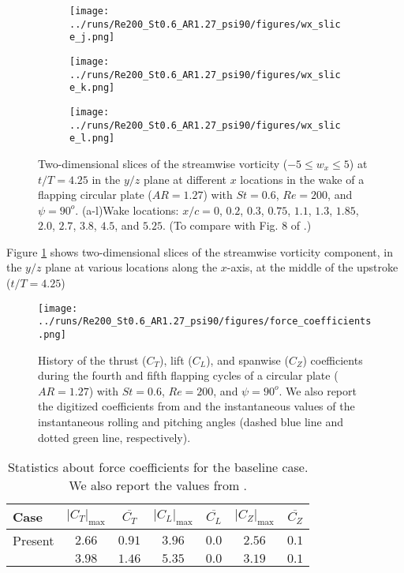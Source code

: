 \begin{figure}
\begin{subfigure}[t]{0.24\textwidth}
    \centering
    \texttt{[image: ../runs/Re200\_St0.6\_AR1.27\_psi90/figures/wx\_slice\_j.png]}
    \caption{}
  \end{subfigure}
  \begin{subfigure}[t]{0.24\textwidth}
    \centering
    \texttt{[image: ../runs/Re200\_St0.6\_AR1.27\_psi90/figures/wx\_slice\_k.png]}
    \caption{}
  \end{subfigure}
  \begin{subfigure}[t]{0.24\textwidth}
    \centering
    \texttt{[image: ../runs/Re200\_St0.6\_AR1.27\_psi90/figures/wx\_slice\_l.png]}
    \caption{}
  \end{subfigure}
  \caption{Two-dimensional slices of the streamwise vorticity ($-5 \leq w_x \leq 5$) at $t / T = 4.25$ in the $y/z$ plane at different $x$ locations in the wake of a flapping circular plate ($AR = 1.27$) with $St = 0.6$, $Re = 200$, and $\psi = 90^o$. (a-l)Wake locations: $x / c = 0$, $0.2$, $0.3$, $0.75$, $1.1$, $1.3$, $1.85$, $2.0$, $2.7$, $3.8$, $4.5$, and $5.25$. (To compare with Fig. 8 of \citet{li_dong_2016}.)}
  \label{fig:baseline_wx_slices}
\end{figure}

Figure \ref{fig:baseline_wx_slices} shows two-dimensional slices of the streamwise vorticity component, in the $y/z$ plane at various locations along the $x$-axis, at the middle of the upstroke ($t/T = 4.25$)

\begin{figure}
  \centering
  \texttt{[image: ../runs/Re200\_St0.6\_AR1.27\_psi90/figures/force\_coefficients.png]}
  \caption{History of the thrust ($C_T$), lift ($C_L$), and spanwise ($C_Z$) coefficients during the fourth and fifth flapping cycles of a circular plate ($AR = 1.27$) with $St = 0.6$, $Re = 200$, and $\psi = 90^o$. We also report the digitized coefficients from \cite{li_dong_2016} and the instantaneous values of the instantaneous rolling and pitching angles (dashed blue line and dotted green line, respectively).}
  \label{fig:baseline_force_coefficients}
\end{figure}

\begin{table}
  \centering
  \begin{tabular}{lcccccc}
    \hline\hline
    Case & $\left| C_T \right|_\text{max}$ & $\overline{C_T}$ & $\left| C_L \right|_\text{max}$ & $\overline{C_L}$ & $\left| C_Z \right|_\text{max}$ & $\overline{C_Z}$ \\
    \hline
    Present & $2.66$ & $0.91$ & $3.96$ & $0.0$ & $2.56$ & $0.1$ \\
    \citet{li_dong_2016} & $3.98$ & $1.46$ & $5.35$ & $0.0$ & $3.19$ & $0.1$ \\
    \hline\hline
  \end{tabular}
  \caption{Statistics about force coefficients for the baseline case. We also report the values from \citet{li_dong_2016}.}
  \label{tab:baseline_force_coefficients}
\end{table}

